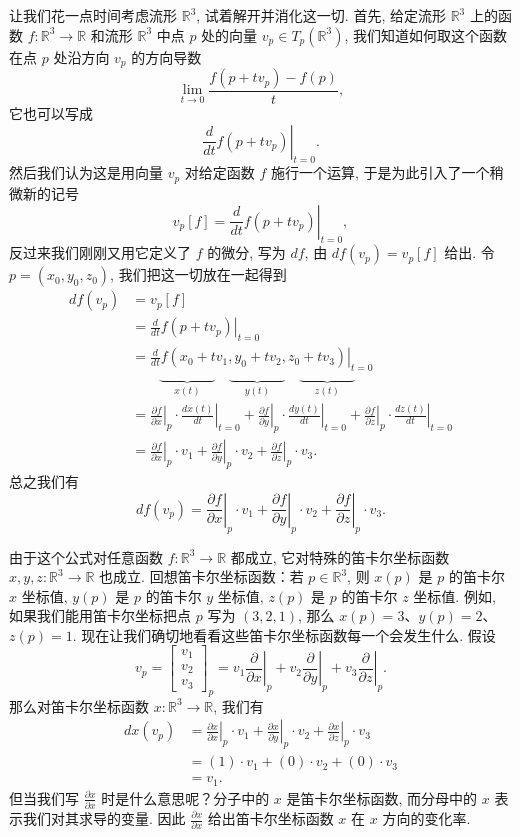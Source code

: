 让我们花一点时间考虑流形 $\mathbb{R}^3$, 试着解开并消化这一切. 首先, 给定流形 $\mathbb{R}^3$ 上的函数 $f:\mathbb{R}^3\to\mathbb{R}$ 和流形 $\mathbb{R}^3$ 中点 $p$ 处的向量 $v_p\in T_p(\mathbb{R}^3)$, 我们知道如何取这个函数在点 $p$ 处沿方向 $v_p$ 的方向导数
\[
\lim_{t\to0}\frac{f(p+tv_p)-f(p)}{t},
\]
它也可以写成
\[
\left.\frac{d}{dt}f(p+tv_p)\right|_{t=0}.
\]
然后我们认为这是用向量 $v_p$ 对给定函数 $f$ 施行一个运算, 于是为此引入了一个稍微新的记号
\[
v_p[f]=\left.\frac{d}{dt}f(p+tv_p)\right|_{t=0},
\]
反过来我们刚刚又用它定义了 $f$ 的微分, 写为 $df$, 由 $df(v_p)=v_p[f]$ 给出. 令 $p=(x_0,y_0,z_0)$, 我们把这一切放在一起得到
\begin{align*}
df(v_p)&=v_p[f]\\
&=\left.\frac{d}{dt}f(p+tv_p)\right|_{t=0}\\
&=\left.\frac{d}{dt}f(x_0+tv_1,y_0+tv_2,z_0+tv_3)\right|_{t=0}\\
&\qquad\underbrace{\qquad\qquad}_{x(t)}\quad\underbrace{\qquad\qquad}_{y(t)}\quad\underbrace{\qquad\qquad}_{z(t)}\\
&=\left.\frac{\partial f}{\partial x}\right|_{p}\cdot\left.\frac{dx(t)}{dt}\right|_{t=0}
+\left.\frac{\partial f}{\partial y}\right|_{p}\cdot\left.\frac{dy(t)}{dt}\right|_{t=0}
+\left.\frac{\partial f}{\partial z}\right|_{p}\cdot\left.\frac{dz(t)}{dt}\right|_{t=0}\\
&=\left.\frac{\partial f}{\partial x}\right|_{p}\cdot v_1+\left.\frac{\partial f}{\partial y}\right|_{p}\cdot v_2+\left.\frac{\partial f}{\partial z}\right|_{p}\cdot v_3.
\end{align*}
总之我们有
\[
df(v_p)=\left.\frac{\partial f}{\partial x}\right|_{p}\cdot v_1+\left.\frac{\partial f}{\partial y}\right|_{p}\cdot v_2+\left.\frac{\partial f}{\partial z}\right|_{p}\cdot v_3.
\]

由于这个公式对任意函数 $f:\mathbb{R}^3\to\mathbb{R}$ 都成立, 它对特殊的笛卡尔坐标函数 $x,y,z:\mathbb{R}^3\to\mathbb{R}$ 也成立. 回想笛卡尔坐标函数：若 $p\in\mathbb{R}^3$, 则 $x(p)$ 是 $p$ 的笛卡尔 $x$ 坐标值, $y(p)$ 是 $p$ 的笛卡尔 $y$ 坐标值, $z(p)$ 是 $p$ 的笛卡尔 $z$ 坐标值. 例如, 如果我们能用笛卡尔坐标把点 $p$ 写为 $(3,2,1)$, 那么 $x(p)=3$、$y(p)=2$、$z(p)=1$. 现在让我们确切地看看这些笛卡尔坐标函数每一个会发生什么. 假设
\[
v_p=\begin{bmatrix}v_1\\v_2\\v_3\end{bmatrix}_p=v_1\left.\frac{\partial}{\partial x}\right|_{p}+v_2\left.\frac{\partial}{\partial y}\right|_{p}+v_3\left.\frac{\partial}{\partial z}\right|_{p}.
\]
那么对笛卡尔坐标函数 $x:\mathbb{R}^3\to\mathbb{R}$, 我们有
\begin{align*}
dx(v_p)&=\left.\frac{\partial x}{\partial x}\right|_{p}\cdot v_1+\left.\frac{\partial x}{\partial y}\right|_{p}\cdot v_2+\left.\frac{\partial x}{\partial z}\right|_{p}\cdot v_3\\
&=(1)\cdot v_1+(0)\cdot v_2+(0)\cdot v_3\\
&=v_1.
\end{align*}
但当我们写 $\frac{\partial x}{\partial x}$ 时是什么意思呢？分子中的 $x$ 是笛卡尔坐标函数, 而分母中的 $x$ 表示我们对其求导的变量. 因此 $\frac{\partial x}{\partial x}$ 给出笛卡尔坐标函数 $x$ 在 $x$ 方向的变化率.

